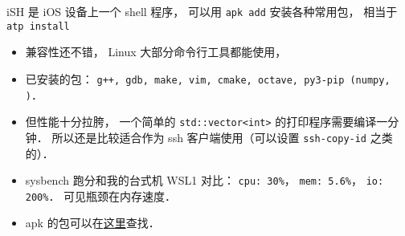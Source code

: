 
\begin{issues}
\issueDraft
\end{issues}

iSH 是 iOS 设备上一个 shell 程序， 可以用 \verb|apk add| 安装各种常用包， 相当于 \verb|atp install|

\begin{itemize}
\item 兼容性还不错， Linux 大部分命令行工具都能使用， \item 已安装的包： \verb|g++, gdb, make, vim, cmake, octave, py3-pip (numpy, )|．
\item 但性能十分拉胯， 一个简单的 \verb|std::vector<int>| 的打印程序需要编译一分钟． 所以还是比较适合作为 ssh 客户端使用（可以设置 \verb|ssh-copy-id| 之类的）．
\item sysbench 跑分和我的台式机 WSL1 对比： \verb|cpu: 30%|， \verb|mem: 5.6%|， \verb|io: 200%|． 可见瓶颈在内存速度．
\item apk 的包可以在\href{https://pkgs.alpinelinux.org/}{这里}查找．

\end{itemize}
